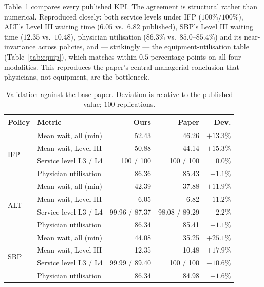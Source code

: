 \documentclass[sigconf,nonacm]{acmart}
\begin{document}
Table~\ref{tab:validate} compares every published KPI. The agreement is
structural rather than numerical. Reproduced closely: both service levels under
IFP ($100\%/100\%$), ALT's Level III waiting time ($6.05$ vs.\ $6.82$
published), SBP's Level III waiting time ($12.35$ vs.\ $10.48$), physician
utilisation ($86.3\%$ vs.\ $85.0$--$85.4\%$) and its near-invariance across
policies, and --- strikingly --- the equipment-utilisation table
(Table~\ref{tab:equip}), which matches within $0.5$ percentage points on all
four modalities. This reproduces the paper's central managerial conclusion that
physicians, not equipment, are the bottleneck.

\begin{table}[t]
\caption{Validation against the base paper. Deviation is relative to the
         published value; $100$ replications.}
\label{tab:validate}
\small
\begin{tabular}{@{}llrrr@{}}
\toprule
\textbf{Policy} & \textbf{Metric} & \textbf{Ours} & \textbf{Paper} & \textbf{Dev.} \\
\midrule
\multirow{4}{*}{IFP}
 & Mean wait, all (min)   & 52.43  & 46.26  & $+13.3\%$ \\
 & Mean wait, Level III   & 50.88  & 44.14  & $+15.3\%$ \\
 & Service level L3 / L4  & 100 / 100 & 100 / 100 & $0.0\%$ \\
 & Physician utilisation  & 86.36  & 85.43  & $+1.1\%$ \\
\midrule
\multirow{4}{*}{ALT}
 & Mean wait, all (min)   & 42.39  & 37.88  & $+11.9\%$ \\
 & Mean wait, Level III   & 6.05   & 6.82   & $-11.2\%$ \\
 & Service level L3 / L4  & 99.96 / 87.37 & 98.08 / 89.29 & $-2.2\%$ \\
 & Physician utilisation  & 86.34  & 85.41  & $+1.1\%$ \\
\midrule
\multirow{4}{*}{SBP}
 & Mean wait, all (min)   & 44.08  & 35.25  & $+25.1\%$ \\
 & Mean wait, Level III   & 12.35  & 10.48  & $+17.9\%$ \\
 & Service level L3 / L4  & 99.99 / 89.40 & 100 / 100 & $-10.6\%$ \\
 & Physician utilisation  & 86.34  & 84.98  & $+1.6\%$ \\
\bottomrule
\end{tabular}
\end{table}
\end{document}
